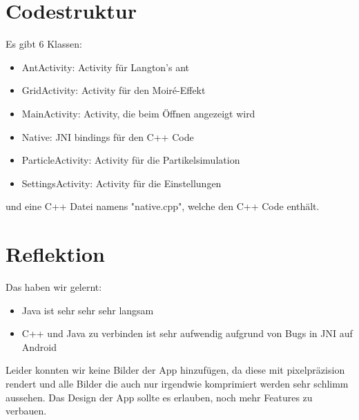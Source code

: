 \documentclass[8pt, letterpaper]{article}
\begin{document}
\section{Codestruktur}
Es gibt 6 Klassen:
\begin{itemize}
    \item AntActivity: Activity für Langton's ant
    \item GridActivity: Activity für den Moiré-Effekt
    \item MainActivity: Activity, die beim Öffnen angezeigt wird
    \item Native: JNI bindings für den C++ Code
    \item ParticleActivity: Activity für die Partikelsimulation
    \item SettingsActivity: Activity für die Einstellungen
\end{itemize}

und eine C++ Datei namens "native.cpp", welche den C++ Code enthält.

\section{Reflektion}
Das haben wir gelernt:
\begin{itemize}
    \item Java ist sehr sehr sehr langsam
    \item C++ und Java zu verbinden ist sehr aufwendig aufgrund von Bugs in JNI auf Android
\end{itemize}

Leider konnten wir keine Bilder der App hinzufügen, da diese mit pixelpräzision rendert und alle Bilder die auch nur irgendwie komprimiert werden sehr schlimm aussehen.
Das Design der App sollte es erlauben, noch mehr Features zu verbauen.
\end{document}
